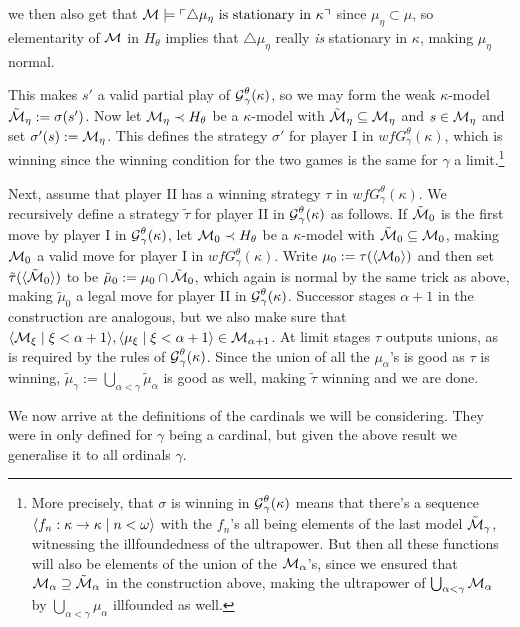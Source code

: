 \documentclass[../main]{subfiles}
\begin{document}
{{		we then also get that $\operatorname{\mathcal M}\models\ulcorner \triangle\mu_\eta\text{ is stationary in $\kappa$} \urcorner$ since $\mu_\eta\subset\mu$, so elementarity of $\operatorname{\mathcal M}$ in $H_\theta$ implies that $\triangle\mu_\eta$ really \textit{is} stationary in $\kappa$, making $\mu_\eta$ normal.
	}
	
	This makes $s'$ a valid partial play of $\operatorname{\mathcal G}_\gamma^\theta(\kappa)$, so we may form the weak $\kappa$-model $\tilde{\operatorname{\mathcal M}}_\eta:=\sigma(s')$. Now let $\operatorname{\mathcal M}_\eta\prec H_\theta$ be a $\kappa$-model with $\tilde{\operatorname{\mathcal M}}_\eta\subseteq\operatorname{\mathcal M}_\eta$ and $s\in\operatorname{\mathcal M}_\eta$ and set $\sigma'(s):=\operatorname{\mathcal M}_\eta$. This defines the strategy $\sigma'$ for player I in $wfG_\gamma^\theta(\kappa)$, which is winning since the winning condition for the two games is the same for $\gamma$ a limit.\footnote{More precisely, that $\sigma$ is winning in $\operatorname{\mathcal G}_\gamma^\theta(\kappa)$ means that there's a sequence $\langle f_n:\kappa\to\kappa\mid n<\omega\rangle$ with the $f_n$'s all being elements of the last model $\tilde{\operatorname{\mathcal M}}_\gamma$, witnessing the illfoundedness of the ultrapower. But then all these functions will also be elements of the union of the $\operatorname{\mathcal M}_\alpha$'s, since we ensured that $\operatorname{\mathcal M}_\alpha\supseteq\tilde{\operatorname{\mathcal M}}_\alpha$ in the construction above, making the ultrapower of $\bigcup_{\alpha<\gamma}\operatorname{\mathcal M}_\alpha$ by $\bigcup_{\alpha<\gamma}\mu_\alpha$ illfounded as well.}

	\qquad Next, assume that player II has a winning strategy $\tau$ in $wfG_\gamma^\theta(\kappa)$. We recursively define a strategy $\tilde\tau$ for player II in $\operatorname{\mathcal G}_\gamma^\theta(\kappa)$ as follows. If $\tilde{\operatorname{\mathcal M}}_0$ is the first move by player I in $\operatorname{\mathcal G}_\gamma^\theta(\kappa)$, let $\operatorname{\mathcal M}_0\prec H_\theta$ be a $\kappa$-model with $\tilde{\operatorname{\mathcal M}}_0\subseteq\operatorname{\mathcal M}_0$, making $\operatorname{\mathcal M}_0$ a valid move for player I in $wfG_\gamma^\theta(\kappa)$. Write $\mu_0:=\tau(\langle \operatorname{\mathcal M}_0\rangle)$ and then set $\tilde\tau(\langle \tilde{\operatorname{\mathcal M}}_0\rangle)$ to be $\tilde\mu_0:=\mu_0\cap\tilde{\operatorname{\mathcal M}}_0$, which again is normal by the same trick as above, making $\tilde\mu_0$ a legal move for player II in $\operatorname{\mathcal G}_\gamma^\theta(\kappa)$. Successor stages $\alpha+1$ in the construction are analogous, but we also make sure that $\langle \operatorname{\mathcal M}_\xi\mid\xi<\alpha+1\rangle,\langle \mu_\xi\mid\xi<\alpha+1\rangle\in\operatorname{\mathcal M}_{\alpha+1}$. At limit stages $\tau$ outputs unions, as is required by the rules of $\operatorname{\mathcal G}_\gamma^\theta(\kappa)$. Since the union of all the $\mu_\alpha$'s is good as $\tau$ is winning, $\tilde\mu_\gamma:=\bigcup_{\alpha<\gamma}\tilde\mu_\alpha$ is good as well, making $\tilde\tau$ winning and we are done.
}

We now arrive at the definitions of the cardinals we will be considering. They were in \cite{HolySchlicht} only defined for $\gamma$ being a cardinal, but given the above result we generalise it to all ordinals $\gamma$.
\end{document}

